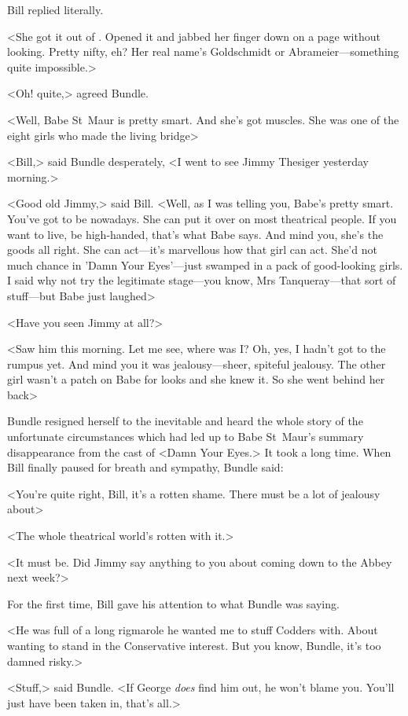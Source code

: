 Bill replied literally.

<She got it out of . Opened it and jabbed her finger down on a page without looking. Pretty nifty, eh? Her real name's Goldschmidt or Abrameier—something quite impossible.>

<Oh! quite,> agreed Bundle.

<Well, Babe St~Maur is pretty smart. And she's got muscles. She was one of the eight girls who made the living bridge\longdash>

<Bill,> said Bundle desperately, <I went to see Jimmy Thesiger yesterday morning.>

<Good old Jimmy,> said Bill. <Well, as I was telling you, Babe's pretty smart. You've got to be nowadays. She can put it over on most theatrical people. If you want to live, be high-handed, that's what Babe says. And mind you, she's the goods all right. She can act—it's marvellous how that girl can act. She'd not much chance in 'Damn Your Eyes'—just swamped in a pack of good-looking girls. I said why not try the legitimate stage—you know, Mrs Tanqueray—that sort of stuff—but Babe just laughed\longdash>

<Have you seen Jimmy at all?>

<Saw him this morning. Let me see, where was I? Oh, yes, I hadn't got to the rumpus yet. And mind you it was jealousy—sheer, spiteful jealousy. The other girl wasn't a patch on Babe for looks and she knew it. So she went behind her back\longdash>

Bundle resigned herself to the inevitable and heard the whole story of the unfortunate circumstances which had led up to Babe St~Maur's summary disappearance from the cast of <Damn Your Eyes.> It took a long time. When Bill finally paused for breath and sympathy, Bundle said:

<You're quite right, Bill, it's a rotten shame. There must be a lot of jealousy about\longdash>

<The whole theatrical world's rotten with it.>

<It must be. Did Jimmy say anything to you about coming down to the Abbey next week?>

For the first time, Bill gave his attention to what Bundle was saying.

<He was full of a long rigmarole he wanted me to stuff Codders with. About wanting to stand in the Conservative interest. But you know, Bundle, it's too damned risky.>

<Stuff,> said Bundle. <If George \emph{does} find him out, he won't blame you. You'll just have been taken in, that's all.>

